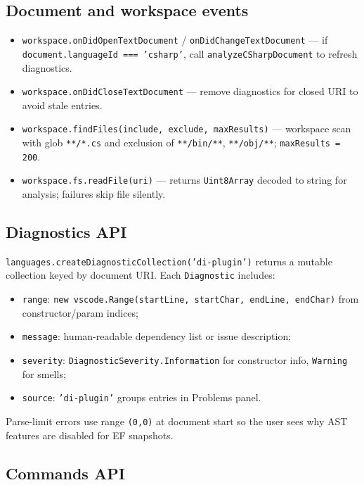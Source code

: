\subsection{Document and workspace events}

\begin{itemize}
	\item \texttt{workspace.onDidOpenTextDocument} / \texttt{onDidChangeTextDocument} --- if \texttt{document.languageId === 'csharp'}, call \texttt{analyzeCSharpDocument} to refresh diagnostics.
	\item \texttt{workspace.onDidCloseTextDocument} --- remove diagnostics for closed URI to avoid stale entries.
	\item \texttt{workspace.findFiles(include, exclude, maxResults)} --- workspace scan with glob \texttt{**/*.cs} and exclusion of \texttt{**/bin/**}, \texttt{**/obj/**}; \texttt{maxResults = 200}.
	\item \texttt{workspace.fs.readFile(uri)} --- returns \texttt{Uint8Array} decoded to string for analysis; failures skip file silently.
\end{itemize}

\subsection{Diagnostics API}

\texttt{languages.createDiagnosticCollection('di-plugin')} returns a mutable collection keyed by document URI. Each \texttt{Diagnostic} includes:
\begin{itemize}
	\item \texttt{range}: \texttt{new vscode.Range(startLine, startChar, endLine, endChar)} from constructor/param indices;
	\item \texttt{message}: human-readable dependency list or issue description;
	\item \texttt{severity}: \texttt{DiagnosticSeverity.Information} for constructor info, \texttt{Warning} for smells;
	\item \texttt{source}: \texttt{'di-plugin'} groups entries in Problems panel.
\end{itemize}

Parse-limit errors use range \texttt{(0,0)} at document start so the user sees why AST features are disabled for EF snapshots.

\subsection{Commands API}

